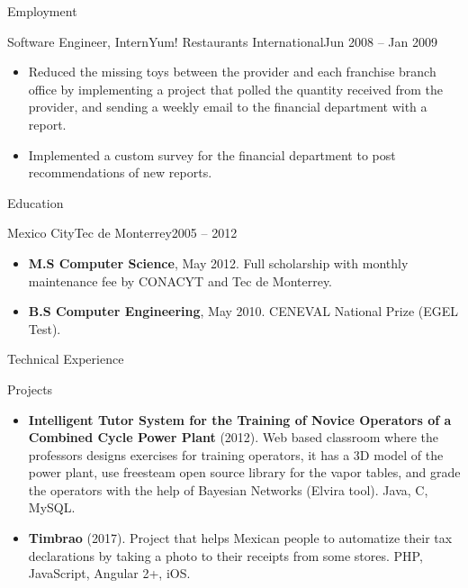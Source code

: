 \documentclass[calibri]{../macdowell-cv/mcdowellcv}
\begin{document}
\begin{cvsection}{Employment}
		\begin{cvsubsection}{Software Engineer, Intern}{Yum! Restaurants International}{Jun 2008 -- Jan 2009}
			\begin{itemize}
				\item Reduced the missing toys between the provider and each franchise branch office by implementing a project that polled the quantity received from the provider, and sending a weekly email to the financial department with a report.
				\item Implemented a custom survey for the financial department to post recommendations of new reports.
			\end{itemize}
		\end{cvsubsection}
	\end{cvsection}
	
	\begin{cvsection}{Education}
		\begin{cvsubsection}{Mexico City}{Tec de Monterrey}{2005 -- 2012}
			\begin{itemize}
				\item \textbf{M.S Computer Science}, May 2012. Full scholarship with monthly maintenance fee by CONACYT and Tec de Monterrey.
				\item \textbf{B.S Computer Engineering}, May 2010. CENEVAL National Prize (EGEL Test).
			\end{itemize}
		\end{cvsubsection}
	\end{cvsection}
	
	\begin{cvsection}{Technical Experience}
		\begin{cvsubsection}{Projects}{}{}
			\begin{itemize}
				\item \textbf{Intelligent Tutor System for the Training of Novice Operators of a Combined Cycle Power Plant} (2012). Web based classroom where the professors designs exercises for training operators, it has a 3D model of the power plant, use freesteam open source library for the vapor tables, and grade the operators with the help of Bayesian Networks (Elvira tool). Java, C, MySQL.
				\item \textbf{Timbrao} (2017). Project that helps Mexican people to automatize their tax declarations by taking a photo to their receipts from some stores.  PHP, JavaScript, Angular 2+, iOS.
			\end{itemize}
		\end{cvsubsection}
	\end{cvsection}
	
\end{document}
